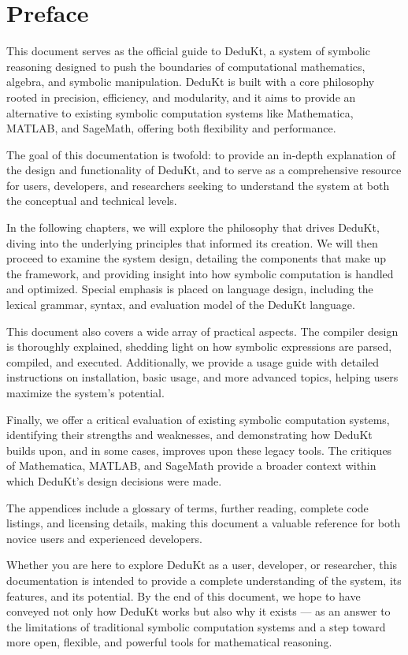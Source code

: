 \section*{Preface}\label{sec:preface}
This document serves as the official guide to DeduKt, a system of symbolic reasoning designed to push the boundaries of computational mathematics, algebra, and symbolic manipulation.
DeduKt is built with a core philosophy rooted in precision, efficiency, and modularity, and it aims to provide an alternative to existing symbolic computation systems like Mathematica, MATLAB, and SageMath, offering both flexibility and performance.


The goal of this documentation is twofold: to provide an in-depth explanation of the design and functionality of DeduKt, and to serve as a comprehensive resource for users, developers, and researchers seeking to understand the system at both the conceptual and technical levels.


In the following chapters, we will explore the philosophy that drives DeduKt, diving into the underlying principles that informed its creation.
We will then proceed to examine the system design, detailing the components that make up the framework, and providing insight into how symbolic computation is handled and optimized.
Special emphasis is placed on language design, including the lexical grammar, syntax, and evaluation model of the DeduKt language.


This document also covers a wide array of practical aspects.
The compiler design is thoroughly explained, shedding light on how symbolic expressions are parsed, compiled, and executed. Additionally, we provide a usage guide with detailed instructions on installation, basic usage, and more advanced topics, helping users maximize the system’s potential.


Finally, we offer a critical evaluation of existing symbolic computation systems, identifying their strengths and weaknesses, and demonstrating how DeduKt builds upon, and in some cases, improves upon these legacy tools.
The critiques of Mathematica, MATLAB, and SageMath provide a broader context within which DeduKt’s design decisions were made.


The appendices include a glossary of terms, further reading, complete code listings, and licensing details, making this document a valuable reference for both novice users and experienced developers.


Whether you are here to explore DeduKt as a user, developer, or researcher, this documentation is intended to provide a complete understanding of the system, its features, and its potential.
By the end of this document, we hope to have conveyed not only how DeduKt works but also why it exists — as an answer to the limitations of traditional symbolic computation systems and a step toward more open, flexible, and powerful tools for mathematical reasoning.

